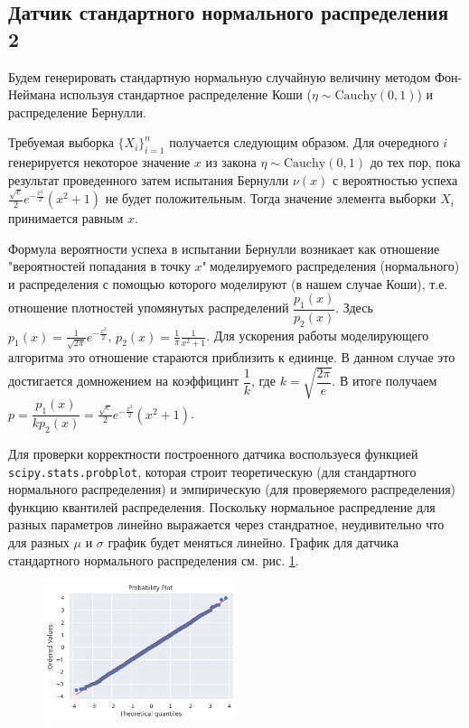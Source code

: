 \subsection{Датчик стандартного нормального распределения 2} \label{4.2}
    Будем генерировать стандартную нормальную случайную величину методом 
    Фон-Неймана используя стандартное распределение Коши 
    ($\eta \sim \mathrm{Cauchy}(0,1)$) и распределение Бернулли.

    Требуемая выборка $\{X_i\}_{i=1}^n$ получается следующим образом. Для очередного $i$
    генерируется некоторое значение $x$ из закона $\eta \sim \mathrm{Cauchy}(0,1)$
    до тех пор, пока результат проведенного затем испытания Бернулли $\nu(x)$ с 
    вероятностью успеха $\frac{\sqrt{e}}{2} e^{-\frac{x^2}{2}} (x^2+1)$ не 
    будет положительным. Тогда значение элемента выборки $X_i$ принимается 
    равным $x$.

    Формула вероятности успеха в испытании Бернулли возникает как отношение
    "вероятностей попадания в точку $x$"$~$моделируемого распределения 
    (нормального) и распределения с помощью которого моделируют 
    (в нашем случае Коши), т.е. отношение плотностей 
    упомянутых распределений $\dfrac{p_1(x)}{p_2(x)}$. Здесь 
    $p_1(x) = \frac{1}{\sqrt{2\pi}}e^{-\frac{x^2}{2}}$, 
    $p_2(x) = \frac{1}{\pi}\frac{1}{x^2 + 1}$. Для ускорения работы 
    моделирующего алгоритма это отношение стараются приблизить к едиинце. 
    В данном случае это достигается домножением на коэффицинт $\dfrac{1}{k}$, 
    где $k = \sqrt{\dfrac{2\pi}{e}}$. В итоге получаем $p = 
    \dfrac{p_1(x)}{k p_2(x)} = \frac{\sqrt{e}}{2} e^{-\frac{x^2}{2}} (x^2+1)$.

    Для проверки корректности построенного датчика воспользуеся функцией 
    \texttt{scipy.stats.probplot}, которая строит теоретическую 
    (для стандартного нормального распределения) и эмпирическую 
    (для проверяемого распределения) функцию квантилей распределения. Поскольку 
    нормальное распредление для разных параметров линейно выражается через 
    стандратное, неудивительно что для разных $\mu$ и $\sigma$ график будет 
    меняться линейно. График для датчика стандартного нормального распределения 
    см. рис. \ref{normplot}.

    \begin{figure}[tbp]
        \centering
        \includegraphics[width=0.5\textwidth]{resources/task4_normplot.png}
        \caption{}
        \label{normplot}
    \end{figure}

